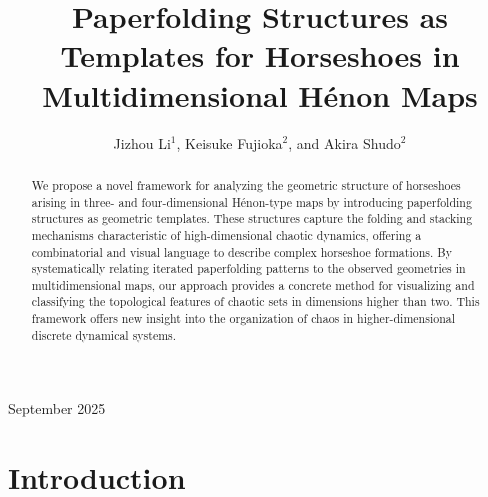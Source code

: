 \documentclass[12pt]{iopart}
\begin{document}
\title[Paperfolding Structures as Templates for Horseshoes]{Paperfolding Structures as Templates for Horseshoes in Multidimensional Hénon Maps}


\author{Jizhou Li$^1$, Keisuke Fujioka$^2$, and Akira Shudo$^2$}

\address{$^1$Research Institute for Electronic Science, Hokkaido University, Sapporo, Hokkaido 001-0020, Japan}
\address{$^2$Department of Physics, Tokyo Metropolitan University, Tokyo 192-0397, Japan}

\vspace{10pt}
\begin{indented}
\item[]September 2025
\end{indented}

\begin{abstract}
We propose a novel framework for analyzing the geometric structure of horseshoes arising in three- and four-dimensional Hénon-type maps by introducing paperfolding structures as geometric templates. These structures capture the folding and stacking mechanisms characteristic of high-dimensional chaotic dynamics, offering a combinatorial and visual language to describe complex horseshoe formations. By systematically relating iterated paperfolding patterns to the observed geometries in multidimensional maps, our approach provides a concrete method for visualizing and classifying the topological features of chaotic sets in dimensions higher than two. This framework offers new insight into the organization of chaos in higher-dimensional discrete dynamical systems.
\end{abstract}

%
%
%
% 
%


\section{Introduction}
\end{document}
